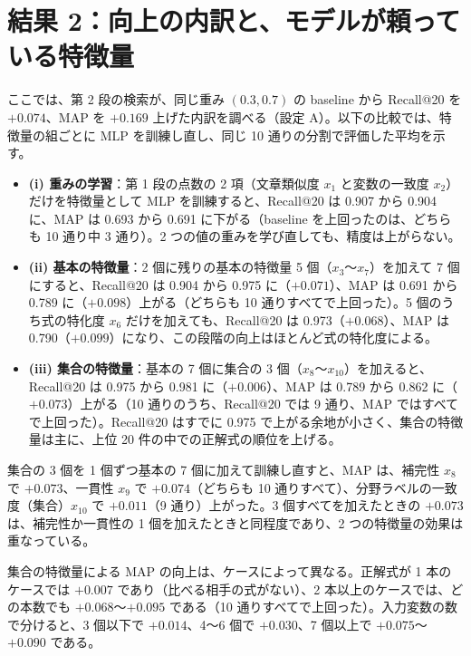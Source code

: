 \documentclass[11pt,a4paper]{ltjsarticle}
\begin{document}
\section{結果 2：向上の内訳と、モデルが頼っている特徴量}\label{sec:mech}
ここでは、第 2 段の検索が、同じ重み $(0.3, 0.7)$ の baseline から Recall@20 を $+0.074$、MAP を $+0.169$ 上げた内訳を調べる（設定 A）。以下の比較では、特徴量の組ごとに MLP を訓練し直し、同じ 10 通りの分割で評価した平均を示す。
\begin{itemize}[leftmargin=1.5em]
  \item \textbf{(i) 重みの学習}：第 1 段の点数の 2 項（文章類似度 $x_1$ と変数の一致度 $x_2$）だけを特徴量として MLP を訓練すると、Recall@20 は 0.907 から 0.904 に、MAP は 0.693 から 0.691 に下がる（baseline を上回ったのは、どちらも 10 通り中 3 通り）。2 つの値の重みを学び直しても、精度は上がらない。
  \item \textbf{(ii) 基本の特徴量}：2 個に残りの基本の特徴量 5 個（$x_3$〜$x_7$）を加えて 7 個にすると、Recall@20 は 0.904 から 0.975 に（$+0.071$）、MAP は 0.691 から 0.789 に（$+0.098$）上がる（どちらも 10 通りすべてで上回った）。5 個のうち式の特化度 $x_6$ だけを加えても、Recall@20 は 0.973（$+0.068$）、MAP は 0.790（$+0.099$）になり、この段階の向上はほとんど式の特化度による。
  \item \textbf{(iii) 集合の特徴量}：基本の 7 個に集合の 3 個（$x_8$〜$x_{10}$）を加えると、Recall@20 は 0.975 から 0.981 に（$+0.006$）、MAP は 0.789 から 0.862 に（$+0.073$）上がる（10 通りのうち、Recall@20 では 9 通り、MAP ではすべてで上回った）。Recall@20 はすでに 0.975 で上がる余地が小さく、集合の特徴量は主に、上位 20 件の中での正解式の順位を上げる。
\end{itemize}
集合の 3 個を 1 個ずつ基本の 7 個に加えて訓練し直すと、MAP は、補完性 $x_8$ で $+0.073$、一貫性 $x_9$ で $+0.074$（どちらも 10 通りすべて）、分野ラベルの一致度（集合）$x_{10}$ で $+0.011$（9 通り）上がった。3 個すべてを加えたときの $+0.073$ は、補完性か一貫性の 1 個を加えたときと同程度であり、2 つの特徴量の効果は重なっている。

集合の特徴量による MAP の向上は、ケースによって異なる。正解式が 1 本のケースでは $+0.007$ であり（比べる相手の式がない）、2 本以上のケースでは、どの本数でも $+0.068$〜$+0.095$ である（10 通りすべてで上回った）。入力変数の数で分けると、3 個以下で $+0.014$、4〜6 個で $+0.030$、7 個以上で $+0.075$〜$+0.090$ である。
\end{document}
